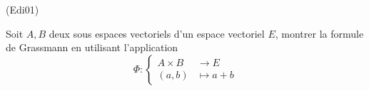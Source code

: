 \begin{tiny}(Edi01)\end{tiny}
Soit $A,B$ deux sous espaces vectoriels d'un espace vectoriel $E$, montrer la formule de Grassmann  en utilisant l'application
\[
\Phi :
\left\lbrace 
\begin{aligned}
 A \times B &\rightarrow E \\ (a,b) &\mapsto a + b
\end{aligned}
\right. 
\]
